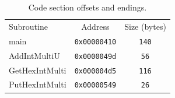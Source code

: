 \documentclass[\FontSize\FontUnit,letterpaper,oneside]{article}
\def\code#1{\texttt{#1}}
\begin{document}
\begin{table}[h!]
\begin{center}
\caption{Code section offsets and endings.}
\label{tab:q1}
\begin{tabular}{ |l||c|c| }
\hline
Subroutine & Address & Size (bytes) \\\hhline{|=||=|=|}
main & \code{0x00000410} & \code{140} \\\hline 
AddIntMultiU & \code{0x0000049d} & \code{56} \\\hline 
GetHexIntMulti & \code{0x000004d5} & \code{116} \\\hline
PutHexIntMulti & \code{0x00000549} & \code{26} \\\hline
\end{tabular}
\end{center}
\end{table}


\label{LastPage}
\end{document}
